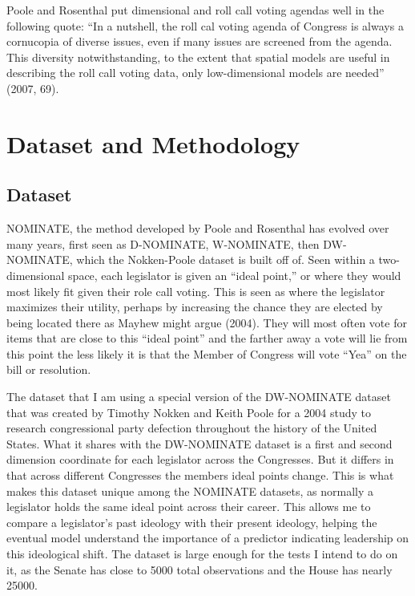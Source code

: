 \documentclass[12pt,twoside]{reedthesis}
\begin{document}
  Poole and Rosenthal put dimensional and roll call voting agendas well in
  the following quote: ``In a nutshell, the roll cal voting agenda of
  Congress is always a cornucopia of diverse issues, even if many issues
  are screened from the agenda. This diversity notwithstanding, to the
  extent that spatial models are useful in describing the roll call voting
  data, only low-dimensional models are needed'' (2007, 69).
  
  \chapter{Dataset and Methodology}\label{dataset-and-methodology}
  
  \section{Dataset}\label{dataset}
  
  NOMINATE, the method developed by Poole and Rosenthal has evolved over
  many years, first seen as D-NOMINATE, W-NOMINATE, then DW-NOMINATE,
  which the Nokken-Poole dataset is built off of. Seen within a
  two-dimensional space, each legislator is given an ``ideal point,'' or
  where they would most likely fit given their role call voting. This is
  seen as where the legislator maximizes their utility, perhaps by
  increasing the chance they are elected by being located there as Mayhew
  might argue (2004). They will most often vote for items that are close
  to this ``ideal point'' and the farther away a vote will lie from this
  point the less likely it is that the Member of Congress will vote
  ``Yea'' on the bill or resolution.
  
  The dataset that I am using a special version of the DW-NOMINATE dataset
  that was created by Timothy Nokken and Keith Poole for a 2004 study to
  research congressional party defection throughout the history of the
  United States. What it shares with the DW-NOMINATE dataset is a first
  and second dimension coordinate for each legislator across the
  Congresses. But it differs in that across different Congresses the
  members ideal points change. This is what makes this dataset unique
  among the NOMINATE datasets, as normally a legislator holds the same
  ideal point across their career. This allows me to compare a
  legislator's past ideology with their present ideology, helping the
  eventual model understand the importance of a predictor indicating
  leadership on this ideological shift. The dataset is large enough for
  the tests I intend to do on it, as the Senate has close to 5000 total
  observations and the House has nearly 25000.
  
\end{document}
